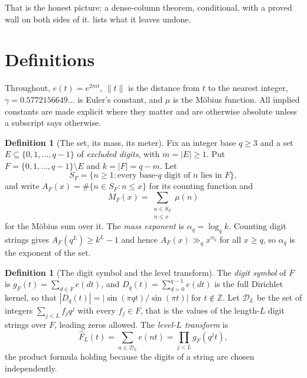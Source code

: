 \documentclass[11pt]{amsart}
\theoremstyle{definition}
\newtheorem{definition}[theorem]{Definition}
\theoremstyle{remark}
\begin{document}
That is the honest picture: a dense-column theorem, conditional, with a proved wall on both sides of it.  lists what it leaves undone.

\section{Definitions}
\label{sec:defs}

Throughout, $e(t) = e^{2\pi i t}$, $\|t\|$ is the distance from $t$ to the nearest integer, $\gamma = 0.5772156649\ldots$ is Euler's constant, and $\mu$ is the M\"obius function. All implied constants are made explicit where they matter and are otherwise absolute unless a subscript says otherwise.

\begin{definition}[The set, its mass, its meter]
\label{def:set}
Fix an integer base $q \ge 3$ and a set $E \subseteq \{0, 1, \dots, q-1\}$ of \emph{excluded digits}, with $m = |E| \ge 1$. Put $F = \{0,1,\dots,q-1\} \setminus E$ and $k = |F| = q - m$. Let
\[
  S_F = \{ n \ge 1 : \text{every base-$q$ digit of $n$ lies in } F \},
\]
and write $A_F(x) = \#\{n \in S_F : n \le x\}$ for its counting function and
\[
  M_F(x) = \sum_{\substack{n \in S_F \\ n \le x}} \mu(n)
\]
for the M\"obius sum over it. The \emph{mass exponent} is $\alpha_q = \log_q k$. Counting digit strings gives $A_F(q^L) \ge k^L - 1$ and hence $A_F(x) \gg_q x^{\alpha_q}$ for all $x \ge q$, so $\alpha_q$ is the exponent of the set.
\end{definition}

\begin{definition}[The digit symbol and the level transform]
\label{def:transform}
The \emph{digit symbol} of $F$ is $g_F(t) = \sum_{d \in F} e(dt)$, and $D_q(t) = \sum_{d=0}^{q-1} e(dt)$ is the full Dirichlet kernel, so that $|D_q(t)| = |\sin(\pi q t)/\sin(\pi t)|$ for $t \notin \mathbb Z$. Let $\mathcal D_L$ be the set of integers $\sum_{j<L} f_j q^j$ with every $f_j \in F$, that is the values of the length-$L$ digit strings over $F$, leading zeros allowed. The \emph{level-$L$ transform} is
\[
  \widehat F_L(t) = \sum_{n \in \mathcal D_L} e(nt) = \prod_{j<L} g_F(q^j t),
\]
the product formula holding because the digits of a string are chosen independently.
\end{definition}
\end{document}
